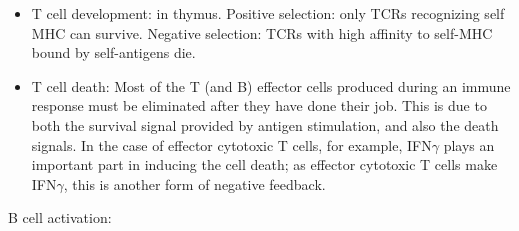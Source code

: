 \documentclass{report}
\begin{document}
\begin{itemize}
\item T cell development: in thymus. Positive selection: only TCRs recognizing self MHC can survive. Negative selection: TCRs with high affinity to self-MHC bound by self-antigens die.  

\item T cell death: Most of the T (and B) effector cells produced during an immune response must be eliminated after they have done their job. This is due to both the survival signal provided by antigen stimulation, and also the death signals. In the case of effector cytotoxic T cells, for example, IFN$\gamma$ plays an important part in inducing the cell death; as effector cytotoxic T cells make IFN$\gamma$, this is another form of negative feedback. 
\end{itemize}

B cell activation: 
\end{document}
